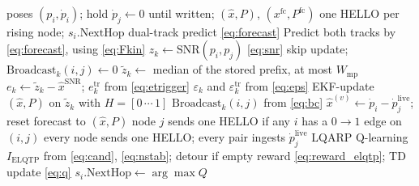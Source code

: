 \begin{algorithm}[!t]
\caption{E-LQTP: Event-Triggered HELLO and Q-Learning Forwarding}
\label{alg:elqtp}
\begin{algorithmic}[1]
\REQUIRE poses $(p_i,\dot{p}_i)$; hold $\dot{p}_j\leftarrow 0$ until written;
$(\hat{x},P)$, $(x^{\mathrm{fc}},P^{\mathrm{fc}})$
\ENSURE one HELLO per rising node; $s_i.\mathrm{NextHop}$
 dual-track predict \eqref{eq:forecast}
  \STATE Predict both tracks by \eqref{eq:forecast}, using \eqref{eq:Fkin}
  \STATE $z_k\leftarrow\mathrm{SNR}(p_i,p_j)$ \eqref{eq:snr}
    \STATE skip update; $\mathrm{Broadcast}_k(i,j)\leftarrow 0$
  \ELSE
    \STATE $\tilde{z}_k\leftarrow$ median of the stored prefix, at most $W_{\mathrm{mp}}$
    \STATE $e_k\leftarrow\tilde{z}_k-\hat{x}^{\mathrm{SNR}}$;
          $e_k^{\mathrm{tr}}$ from \eqref{eq:etrigger}
    \STATE $\varepsilon_k$ and $\varepsilon_k^{\mathrm{tr}}$ from \eqref{eq:eps}
    \STATE EKF-update $(\hat{x},P)$ on $\tilde{z}_k$ with $H=[0\,\cdots\,1]$
    \STATE $\mathrm{Broadcast}_k(i,j)$ from \eqref{eq:bc}
      \STATE $\hat{x}^{(v)}\leftarrow\dot{p}_i-\dot{p}_j^{\mathrm{live}}$;
            reset forecast to $(\hat{x},P)$
    \ENDIF
  \ENDIF
\ENDFOR
{}
  \STATE node $j$ sends one HELLO if any $i$ has a $0\to 1$ edge on $(i,j)$
  \STATE every node sends one HELLO; every pair ingests $\dot{p}_j^{\mathrm{live}}$
\ENDIF
{} LQARP Q-learning
      \cite{liu2026lqarp}
  \STATE $I_{\mathrm{ELQTP}}$ from \eqref{eq:cand}, \eqref{eq:nstab};
        detour if empty 
  \STATE reward \eqref{eq:reward_elqtp}; TD update \eqref{eq:q}
  \STATE $s_i.\mathrm{NextHop}\leftarrow\arg\max Q$
\ENDIF
\end{algorithmic}
\end{algorithm}

